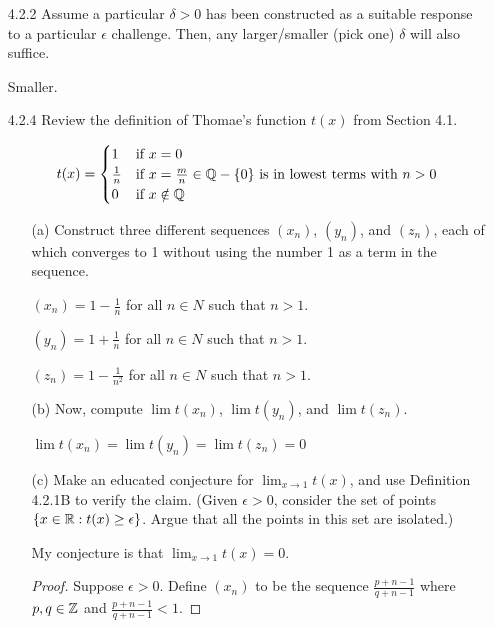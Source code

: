 \documentclass[12pt,letterpaper]{article}
\begin{document}
    \begin{itemize}[leftmargin=!,labelindent=5pt]
        \item [4.2.2] Assume a particular $\delta > 0$ has been constructed as a suitable response to a particular $\epsilon$ challenge. Then, any larger/smaller (pick one) $\delta$ will also suffice.
        
            Smaller.
        \item [4.2.4] Review the definition of Thomae’s function $t(x)$ from Section 4.1.
        
            \[ t(x) =
            \begin{cases}
                1 & \text{if } x = 0\\
                \frac{1}{n} & \text{if } x = \frac{m}{n} \in \mathbb{Q} - \{0\} \text{ is in lowest terms with } n > 0\\
                0 & \text{if } x \notin \mathbb{Q}
            \end{cases}
            \]
            \begin{itemize}
                \item [(a)] Construct three different sequences $(x_n)$, $(y_n)$, and $(z_n)$, each of which converges to 1 without using the number 1 as a term in the sequence.
                
                    $(x_n) = 1 - \frac{1}{n}$ for all $n \in N$ such that $n > 1$.

                    $(y_n) = 1 + \frac{1}{n}$ for all $n \in N$ such that $n > 1$.

                    $(z_n) = 1 - \frac{1}{n^2}$ for all $n \in N$ such that $n > 1$.
                \item [(b)] Now, compute $\lim t(x_n)$, $\lim t(y_n)$, and $\lim t(z_n)$.
                
                    $\lim t(x_n) = \lim t(y_n) = \lim t(z_n) = 0$
                \item [(c)] Make an educated conjecture for $\lim_{x \to 1} t(x)$, and use Definition 4.2.1B to verify the claim. (Given $\epsilon > 0$, consider the set of points $\{x\in \mathbb{R} : t(x) \geq \epsilon\}$. Argue that all the points in this set are isolated.)
                
                    My conjecture is that $\lim_{x \to 1} t(x) = 0$.
                    \begin{proof}
                        Suppose $\epsilon > 0$.
                        Define $(x_n)$ to be the sequence $\frac{p + n - 1}{q + n - 1}$ where $p,q \in \mathbb{Z}$ and $\frac{p + n - 1}{q + n - 1} < 1$.


\end{proof}
\end{itemize}
\end{itemize}
\end{document}
